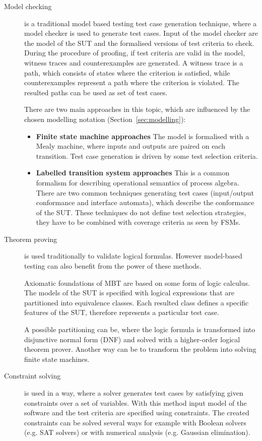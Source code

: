 \begin{description}
	\item[Model checking] is a traditional model based testing test case generation technique, where a model checker is used to generate test cases. Input of the model checker are the model of the SUT and the formalised versions of test criteria to check. During the procedure of proofing, if test criteria are valid in the model, witness traces and counterexamples are generated. A witness trace is a path, which consists of states where the criterion is satisfied, while counterexamples represent a path where the criterion is violated. The resulted paths can be used as set of test cases.

There are two main approaches in this topic, which are influenced by the chosen modelling notation (Section~\ref{sec:modelling}):

\begin{itemize}
	\item \textbf{Finite state machine approaches} The model is formalised with a Mealy machine, where inputs and outputs are paired on each transition. Test case generation is driven by some test selection criteria.
	\item \textbf{Labelled transition system approaches} This is a common formalism for describing operational semantics of process algebra. There are two common techniques generating test cases (input/output conformance and interface automata), which describe the conformance of the SUT. These techniques do not define test selection strategies, they have to be combined with coverage criteria as seen by FSMs.
\end{itemize}

	\item[Theorem proving] is used traditionally to validate logical formulas. However model-based testing can also benefit from the power of these methods.
	
	Axiomatic foundations of MBT are based on some form of logic calculus. The models of the SUT is specified with logical expressions that are partitioned into equivalence classes. Each resulted class defines a specific features of the SUT, therefore represents a particular test case.
	
	A possible partitioning can be, where the logic formula is transformed into disjunctive normal form (DNF) and solved with a higher-order logical theorem prover. Another way can be to transform the problem into solving finite state machines.

	\item[Constraint solving] is used in a way, where a solver generates test cases by satisfying given constraints over a set of variables. With this method input model of the software and the test criteria are specified using constraints. The created constraints can be solved several ways for example with Boolean solvers (e.g. SAT solvers) or with numerical analysis (e.g. Gaussian elimination).

\end{description}

